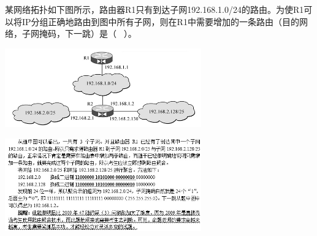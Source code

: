 \question 某网络拓扑如下图所示，路由器R1只有到达子网192.168.1.0/24的路由。为使R1可以将IP分组正确地路由到图中所有子网，则在R1中需要增加的一条路由（目的网络，子网掩码，下一跳）是（
~）。

\includegraphics[width=3.33333in,height=1.33333in]{computerassets/68bb6dada2bc1a91fdc323c08ef13460.jpeg}
\par{}
\begin{solution}\includegraphics[width=3.33333in,height=1.58333in]{computerassets/587e0809d07702794990cae26f6745b2.jpeg}
\end{solution}
